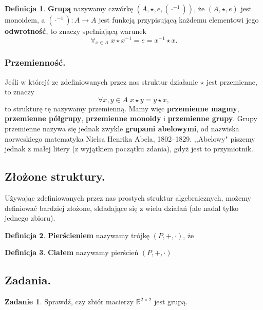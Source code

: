 \documentclass{article}
\theoremstyle{definition}
\newtheorem{definition}{Definicja}[section]
\newtheorem{exercise}{Zadanie}[section]
\begin{document}
\begin{definition}
    \textbf{Grupą} nazywamy czwórkę $(A, \star, e, (\cdot^{-1}))$, że $(A, \star, e)$ jest monoidem, a $(\cdot^{-1}): A \to A$ jest funkcją przypisującą każdemu elementowi jego \textbf{odwrotność}, to znaczy spełniającą warunek
	\begin{equation*}
		\forall_{x \in A}\; {x\star x^{-1} = e = x^{-1} \star x}.
	\end{equation*}
\end{definition}

\subsubsection{Przemienność.}
Jeśli w którejś ze zdefiniowanych przez nas struktur działanie $\star$ jest przemienne, to znaczy
\begin{equation}
	\forall{x,y \in A}\; x \star y = y \star x,
\end{equation}
to strukturę tę nazywamy przemienną.
Mamy więc \textbf{przemienne magmy}, \textbf{przemienne półgrupy}, \textbf{przemienne monoidy} i \textbf{przemienne grupy}.
Grupy przemienne nazywa się jednak zwykle \textbf{grupami abelowymi},
od nazwiska norweskiego matematyka Nielsa Henrika Abela, 1802--1829.
,,Abelowy" piszemy jednak z małej litery (z wyjątkiem początku zdania), gdyż jest to przymiotnik.

\subsection{Złożone struktury.}
Używając zdefiniowanych przez nas prostych struktur algebraicznych,
możemy definiować bardziej złożone,
składające się z wielu działań (ale nadal tylko jednego zbioru).

\begin{definition}
	\textbf{Pierścieniem} nazywamy trójkę $(P, +, \cdot)$, że
\end{definition}

\begin{definition}
	\textbf{Ciałem} nazywamy pierścień $(P, +, \cdot)$
\end{definition}

\subsection{Zadania.}

\begin{exercise}
	Sprawdź, czy zbiór macierzy $\mathbb{R}^{2 \times 2}$ jest grupą.
\end{exercise}
\end{document}

